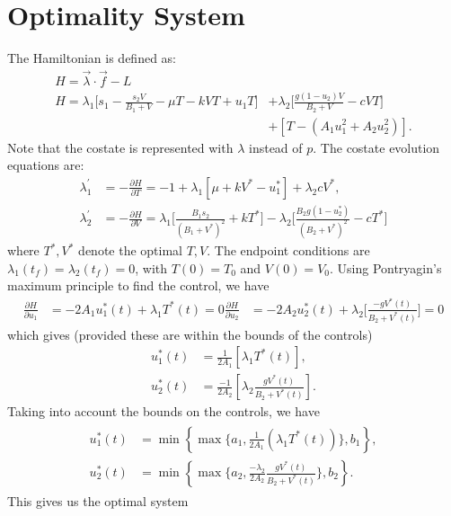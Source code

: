 \section*{Optimality System}
The Hamiltonian is defined as:
\begin{align*}
	H = \vec{\lambda} \cdot \vec{f} - L\\
	H =\lambda_1\Big[ s_1 - \frac{s_2V}{B_1+V}-\mu T-kVT+u_1T \Big] &+ \lambda_2 \Big[\frac{g(1-u_2)V}{B_2+V}-cVT\Big]\\
	 &+  [T-(A_1u_1^2+A_2u_2^2)].
\end{align*}
Note that the costate is represented with $\lambda$ instead of $p$.
The costate evolution equations are:
\begin{align*}
	\lambda_1^{'} &=-\frac{\partial H}{\partial T} =  -1+\lambda_1[\mu+kV^*-u_1^*]+\lambda_2cV^*,\\
	\lambda_2^{'} &= -\frac{\partial H}{\partial V} = \lambda_1\Big[\frac{B_1s_2}{(B_1+V^*)^2}+kT^*\Big] -\lambda_2\Big[\frac{B_2g(1-u_2^*)}				{(B_2+V^*)^2}-cT^*\Big]
\end{align*}
where \(T^*, V^*\) denote the optimal \(T,V\).
The endpoint conditions are $\lambda_1(t_f)=\lambda_2(t_f)=0$, with $T(0)=T_0$ and $V(0)=V_0$. 
Using Pontryagin's maximum principle to find the control, we have
\begin{align*}
\frac{\partial H}{\partial u_1} &= -2A_1u_1^*(t)+\lambda_1T^*(t)=0
\frac{\partial H}{\partial u_2} &= -2A_2u_2^*(t)+\lambda_2\big[\frac{-gV^*(t)}{B_2+V^*(t)}\big]=0
\end{align*}
which gives (provided these are within the bounds of the controls)
\begin{align*}
	u_1^*(t) &= \frac{1}{2A_1}\left[\lambda_1T^*(t)\right],\\
	u_2^*(t) &= \frac{-1}{2A_2}\left[\lambda_2\frac{gV^*(t)}{B_2+V^*(t)}\right].
\end{align*}
Taking into account the bounds on the controls, we have
\begin{align*}
	\begin{split}
		u_1^*(t)&=\min\left\{\max\{a_1,\frac{1}{2A_1}(\lambda_1T^*(t))\},b_1\right\},\\
		u_2^*(t)&=\min\left\{\max\{a_2,\frac{-\lambda_2}{2A_2}\frac{gV^*(t)}{B_2+V^*(t)}\},b_2\right\}.
	\end{split}
\end{align*}
This gives us the optimal system
